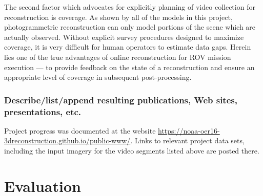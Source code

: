 \documentclass[letterpaper,12pt]{article}
\begin{document}
The second factor which advocates for explicitly planning of video collection for reconstruction is coverage.  As shown by all of the models in this project, photogrammetric reconstruction can only model portions of the scene which are actually observed.   Without explicit survey procedures designed to maximize coverage, it is very difficult for human operators to estimate data gaps.  Herein lies one of the true advantages of online reconstruction for ROV mission execution --- to provide feedback on the state of a reconstruction and ensure an appropriate level of coverage in subsequent post-processing.



\subsubsection{Describe/list/append resulting publications, Web sites, presentations, etc.}

Project progress was documented at the website \url{https://noaa-oer16-3dreconstruction.github.io/public-www/}.    Links to relevant project data sets, including the input imagery for the video segments listed above are posted there.



\section{Evaluation}
\end{document}
